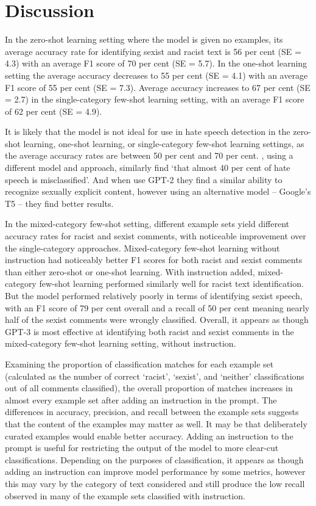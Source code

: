 \documentclass[12pt,]{article}
\begin{document}
\hypertarget{discussion}{%
\section{Discussion}\label{discussion}}

In the zero-shot learning setting where the model is given no examples, its average accuracy rate for identifying sexist and racist text is 56 per cent (SE = 4.3) with an average F1 score of 70 per cent (SE = 5.7). In the one-shot learning setting the average accuracy decreases to 55 per cent (SE = 4.1) with an average F1 score of 55 per cent (SE = 7.3). Average accuracy increases to 67 per cent (SE = 2.7) in the single-category few-shot learning setting, with an average F1 score of 62 per cent (SE = 4.9).

It is likely that the model is not ideal for use in hate speech detection in the zero-shot learning, one-shot learning, or single-category few-shot learning settings, as the average accuracy rates are between 50 per cent and 70 per cent. \citet{davidson2017automated}, using a different model and approach, similarly find `that almost 40 per cent of hate speech is misclassified'. And when \citet{schick2021selfdiagnosis} use GPT-2 they find a similar ability to recognize sexually explicit content, however using an alternative model -- Google's T5 \citep{raffel2020exploring} -- they find better results.

In the mixed-category few-shot setting, different example sets yield different accuracy rates for racist and sexist comments, with noticeable improvement over the single-category approaches. Mixed-category few-shot learning without instruction had noticeably better F1 scores for both racist and sexist comments than either zero-shot or one-shot learning. With instruction added, mixed-category few-shot learning performed similarly well for racist text identification. But the model performed relatively poorly in terms of identifying sexist speech, with an F1 score of 79 per cent overall and a recall of 50 per cent meaning nearly half of the sexist comments were wrongly classified. Overall, it appears as though GPT-3 is most effective at identifying both racist and sexist comments in the mixed-category few-shot learning setting, without instruction.

Examining the proportion of classification matches for each example set (calculated as the number of correct `racist', `sexist', and `neither' classifications out of all comments classified), the overall proportion of matches increases in almost every example set after adding an instruction in the prompt. The differences in accuracy, precision, and recall between the example sets suggests that the content of the examples may matter as well. It may be that deliberately curated examples would enable better accuracy. Adding an instruction to the prompt is useful for restricting the output of the model to more clear-cut classifications. Depending on the purposes of classification, it appears as though adding an instruction can improve model performance by some metrics, however this may vary by the category of text considered and still produce the low recall observed in many of the example sets classified with instruction.
\end{document}
